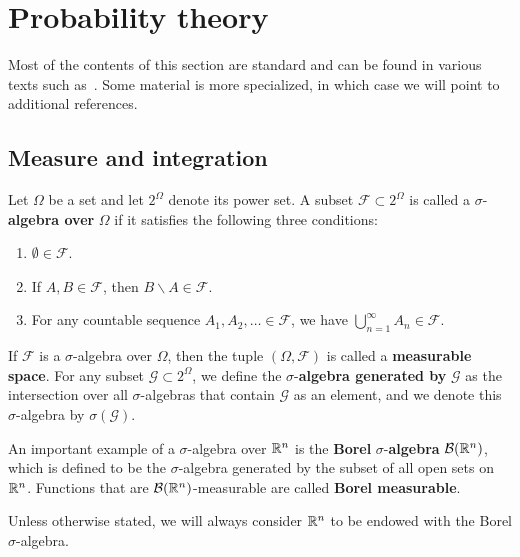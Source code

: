 \section{Probability theory}

Most of the contents of this section are standard and can be found in various texts
such as~\cite{vershynin2018high,billingsley1995}. Some material is more specialized, in which case
we will point to additional references.

\subsection{Measure and integration}

\begin{definition}
    Let $\Omega$ be a set and let $2^\Omega$ denote its power set. A subset $\mathcal{F} \subset 2^\Omega$ is called a $\sigma$-\textbf{algebra
    over} $\Omega$ if it satisfies the following three conditions:
    \begin{enumerate}
        \item $\emptyset \in \mathcal{F}$.
        \item If $A, B \in \mathcal{F}$, then $B \backslash A \in \mathcal{F}$.
        \item For any countable sequence $A_1, A_2, \dots \in \mathcal{F}$, we have $\bigcup_{n=1}^\infty A_n \in \mathcal{F}$.
    \end{enumerate}
    If $\mathcal{F}$ is a $\sigma$-algebra over $\Omega$, then the tuple $(\Omega, \mathcal{F})$
    is called a \textbf{measurable space}. For any subset $\mathcal{G} \subset 2^\Omega$, we define
    the $\sigma$-\textbf{algebra generated by} $\mathcal{G}$ as the intersection over all $\sigma$-algebras
    that contain $\mathcal{G}$ as an element, and we denote this $\sigma$-algebra by $\sigma(\mathcal{G})$.
\end{definition}

\begin{example}
    \label{ex:borel-sigma-algebra}
    An important example of a $\sigma$-algebra over $\mathbb{R}^n$ is the \textbf{Borel} $\sigma$-\textbf{algebra}
    $\mathcal{B}(\mathbb{R}^n)$, which is defined to be the $\sigma$-algebra generated by the subset of all
    open sets on $\mathbb{R}^n$. Functions that are $\mathcal{B}(\mathbb{R}^n)$-measurable are called \textbf{Borel measurable}.
\end{example}

Unless otherwise stated, we will always consider $\mathbb{R}^n$ to be endowed with the Borel $\sigma$-algebra.

